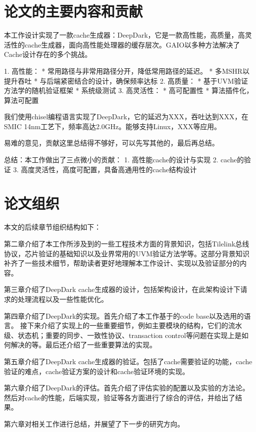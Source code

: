 \section{论文的主要内容和贡献}

本工作设计实现了一款cache生成器：DeepDark，它是一款高性能，高质量，高灵活性的cache生成器，面向高性能处理器的缓存层次。GAIO以多种方法解决了Cache设计存在的多个挑战。

1. 高性能：
  * 常用路径与非常用路径分开，降低常用路径的延迟。
  * 多MSHR以提升吞吐
  * 与后端紧密结合的设计，确保频率达标
2. 高质量：
  * 基于UVM验证方法学的随机验证框架
  * 系统级测试
3. 高灵活性：
  * 高可配置性
  * 算法插件化，算法可配置

  我们使用chisel编程语言实现了DeepDark，它的延迟为XXX，吞吐达到XXX，在SMIC 14nm工艺下，频率高达2.0GHz。能够支持Linux，XXX等应用。

  易难的意见，贡献这里总结得不够好，可以先写其他的，最后再总结。

总结：本工作做出了三点微小的贡献：
1. 高性能cache的设计与实现
2. cache的验证
3. 高度灵活性，高度可配置，具备高通用性的cache结构设计

\section{论文组织}

本文的后续章节组织结构如下：

第二章介绍了本工作所涉及到的一些工程技术方面的背景知识，包括Tilelink总线协议，芯片验证的基础知识以及业界常用的UVM验证方法学等。这部分背景知识补齐了一些技术细节，帮助读者更好地理解本工作设计、实现以及验证部分的内容。

第三章介绍了DeepDark cache生成器的设计，包括架构设计，在此架构设计下请求的处理流程以及一些性能优化。

第四章介绍了DeepDark的实现。首先介绍了本工作基于的code base以及选用的语言。 接下来介绍了实现上的一些重要细节，例如主要模块的结构，它们的流水级、状态机；重要的同步、一致性协议、transaction control等问题在实现上是如何解决的等。最后还介绍了一些重要算法的实现。

第五章介绍了DeepDark cache生成器的验证。包括了cache需要验证的功能，cache验证的难点，cache验证方案的设计和cache验证环境的实现。

第六章介绍了DeepDark的评估。首先介绍了评估实验的配置以及实验的方法论。然后对cache的性能，后端实现，验证等各方面进行了综合的评估，并给出了结果。

第六章对相关工作进行总结，并展望了下一步的研究方向。
